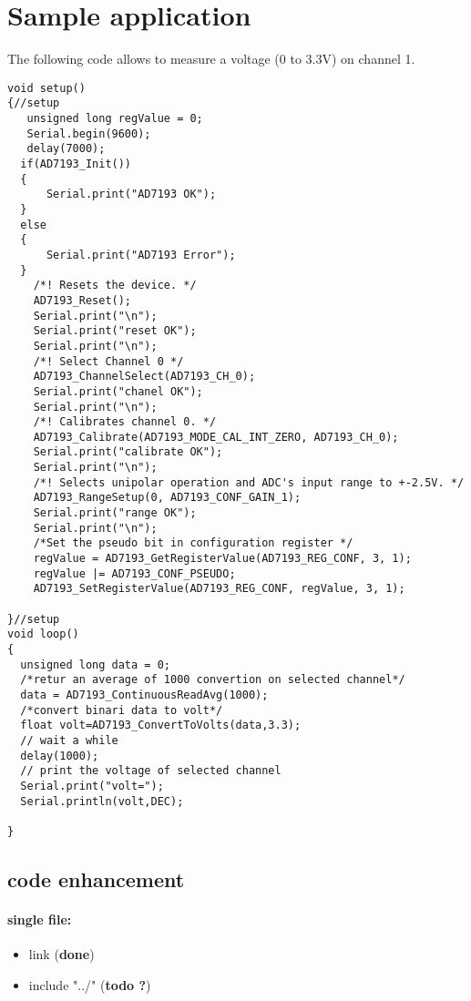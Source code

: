\documentclass[10pt,a4paper]{report}
\begin{document}
\section{Sample application}

The following code allows to measure a voltage (0 to 3.3V) on channel 1.

\begin{lstlisting}
void setup()
{//setup
   unsigned long regValue = 0;
   Serial.begin(9600);
   delay(7000);
  if(AD7193_Init())
  {
      Serial.print("AD7193 OK");
  }
  else
  {
      Serial.print("AD7193 Error");
  }
    /*! Resets the device. */
    AD7193_Reset();
    Serial.print("\n");
    Serial.print("reset OK");
    Serial.print("\n");
    /*! Select Channel 0 */
    AD7193_ChannelSelect(AD7193_CH_0);
    Serial.print("chanel OK");
    Serial.print("\n");
    /*! Calibrates channel 0. */
    AD7193_Calibrate(AD7193_MODE_CAL_INT_ZERO, AD7193_CH_0);
    Serial.print("calibrate OK");
    Serial.print("\n");
    /*! Selects unipolar operation and ADC's input range to +-2.5V. */
    AD7193_RangeSetup(0, AD7193_CONF_GAIN_1);
    Serial.print("range OK");
    Serial.print("\n");
    /*Set the pseudo bit in configuration register */
    regValue = AD7193_GetRegisterValue(AD7193_REG_CONF, 3, 1);
    regValue |= AD7193_CONF_PSEUDO;
    AD7193_SetRegisterValue(AD7193_REG_CONF, regValue, 3, 1);
    
}//setup
void loop()
{ 
  unsigned long data = 0;
  /*retur an average of 1000 convertion on selected channel*/
  data = AD7193_ContinuousReadAvg(1000);
  /*convert binari data to volt*/
  float volt=AD7193_ConvertToVolts(data,3.3);
  // wait a while
  delay(1000);
  // print the voltage of selected channel
  Serial.print("volt=");
  Serial.println(volt,DEC);

}
\end{lstlisting}

\subsection{code enhancement}
\paragraph*{single file:}
\begin{itemize}
\item link (\textbf{done})
\item include "../" (\textbf{todo ?})
\end{itemize}
\end{document}

